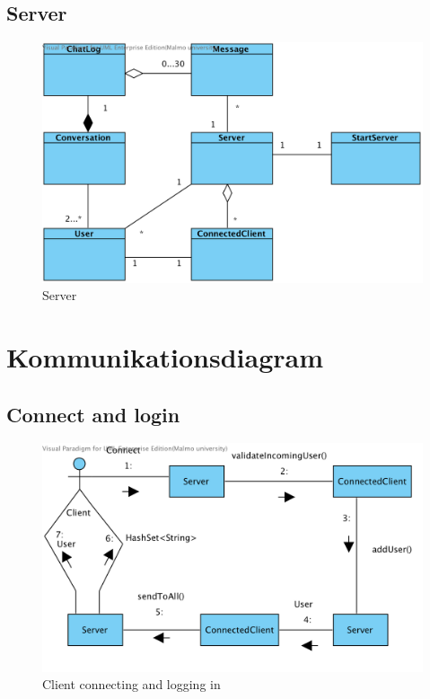\documentclass[a4paper,11pt]{article}
\begin{document}
\subsection{Server}
	\begin{figure}[H]
		\centering
		\includegraphics[width=\textwidth]{diagram/Server.png}
		\caption{Server}
	\end{figure}
\section{Kommunikationsdiagram}

	\subsection{Connect and login}
	\begin{figure}[H]
		\centering
		\includegraphics[width=\textwidth]{diagram/Server_ConnectAndLogin2.png}
		\caption{Client connecting and logging in}
	\end{figure}
\end{document}

